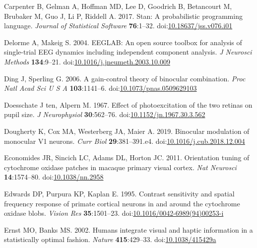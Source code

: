 \documentclass[
]{article}
\newlength{\cslhangindent}
\newlength{\cslentryspacingunit} %
\newenvironment{CSLReferences}[2] %
 {%
  \setlength{\parindent}{0pt}
  \ifodd #1
  \let\oldpar\par
  \def\par{\hangindent=\cslhangindent\oldpar}
  \fi
  \setlength{\parskip}{#2\cslentryspacingunit}
 }%
 {}
\begin{document}
\begin{CSLReferences}{1}{0}
\leavevmode{}%
Carpenter B, Gelman A, Hoffman MD, Lee D, Goodrich B, Betancourt M, Brubaker M, Guo J, Li P, Riddell A. 2017. Stan: A probabilistic programming language. \emph{Journal of Statistical Software} \textbf{76}:1--32. doi:\href{https://doi.org/10.18637/jss.v076.i01}{10.18637/jss.v076.i01}

\leavevmode{}%
Delorme A, Makeig S. 2004. {EEGLAB}: An open source toolbox for analysis of single-trial {EEG} dynamics including independent component analysis. \emph{J Neurosci Methods} \textbf{134}:9--21. doi:\href{https://doi.org/10.1016/j.jneumeth.2003.10.009}{10.1016/j.jneumeth.2003.10.009}

\leavevmode{}%
Ding J, Sperling G. 2006. A gain-control theory of binocular combination. \emph{Proc Natl Acad Sci U S A} \textbf{103}:1141--6. doi:\href{https://doi.org/10.1073/pnas.0509629103}{10.1073/pnas.0509629103}

\leavevmode{}%
Doesschate J ten, Alpern M. 1967. Effect of photoexcitation of the two retinas on pupil size. \emph{J Neurophysiol} \textbf{30}:562--76. doi:\href{https://doi.org/10.1152/jn.1967.30.3.562}{10.1152/jn.1967.30.3.562}

\leavevmode{}%
Dougherty K, Cox MA, Westerberg JA, Maier A. 2019. Binocular modulation of monocular V1 neurons. \emph{Curr Biol} \textbf{29}:381--391.e4. doi:\href{https://doi.org/10.1016/j.cub.2018.12.004}{10.1016/j.cub.2018.12.004}

\leavevmode{}%
Economides JR, Sincich LC, Adams DL, Horton JC. 2011. Orientation tuning of cytochrome oxidase patches in macaque primary visual cortex. \emph{Nat Neurosci} \textbf{14}:1574--80. doi:\href{https://doi.org/10.1038/nn.2958}{10.1038/nn.2958}

\leavevmode{}%
Edwards DP, Purpura KP, Kaplan E. 1995. Contrast sensitivity and spatial frequency response of primate cortical neurons in and around the cytochrome oxidase blobs. \emph{Vision Res} \textbf{35}:1501--23. doi:\href{https://doi.org/10.1016/0042-6989(94)00253-i}{10.1016/0042-6989(94)00253-i}

\leavevmode{}%
Ernst MO, Banks MS. 2002. Humans integrate visual and haptic information in a statistically optimal fashion. \emph{Nature} \textbf{415}:429--33. doi:\href{https://doi.org/10.1038/415429a}{10.1038/415429a}


\end{CSLReferences}
\end{document}
